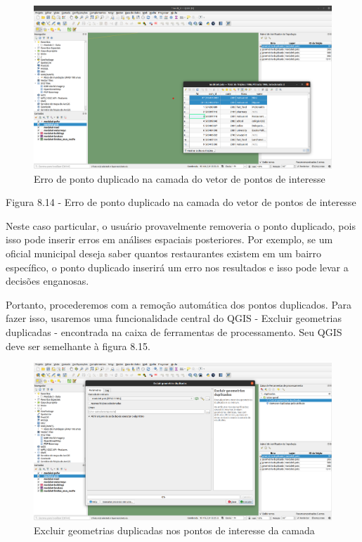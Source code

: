 \documentclass[
]{krantz}
\begin{document}
\begin{figure}
\centering
\includegraphics{media/modulo8/fig814.png}
\caption{Erro de ponto duplicado na camada do vetor de pontos de interesse}
\end{figure}

Figura 8.14 - Erro de ponto duplicado na camada do vetor de pontos de interesse

Neste caso particular, o usuário provavelmente removeria o ponto duplicado, pois isso pode inserir erros em análises espaciais posteriores. Por exemplo, se um oficial municipal deseja saber quantos restaurantes existem em um bairro específico, o ponto duplicado inserirá um erro nos resultados e isso pode levar a decisões enganosas.

Portanto, procederemos com a remoção automática dos pontos duplicados. Para fazer isso, usaremos uma funcionalidade central do QGIS - Excluir geometrias duplicadas - encontrada na caixa de ferramentas de processamento. Seu QGIS deve ser semelhante à figura 8.15.

\begin{figure}
\centering
\includegraphics{media/modulo8/fig815.png}
\caption{Excluir geometrias duplicadas nos pontos de interesse da camada}
\end{figure}
\end{document}
